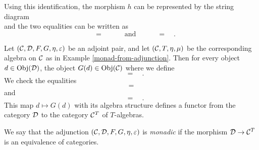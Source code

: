 \documentclass{amsart}
\begin{document}
Using this identification, the morphism $h$ can be represented by the
    string diagram
\[
    
\]
    and the two equalities can be written as
\[
    
    \quad=\quad
    
    \qquad\text{and}\qquad
    
    \quad=\quad
    
    .
\]
\begin{definition}
    Let $(\mathcal C, \mathcal D, F, G, \eta, \varepsilon)$ be an adjoint pair,
        and let $(\mathcal C, T, \eta, \mu)$ be the corresponding
        algebra on $\mathcal C$ as in Example \ref{monad-from-adjunction}.
    Then for every object $d\in \operatorname{Obj}(\mathcal D)$,
        the object $G(d)\in \operatorname{Obj}(\mathcal C)$
        where we define
    \[
        
        \quad=\quad
        
        .
    \]
    We check the equalities
    \[
        
        \quad=\quad
        
    \]
    and
    \[
        
        \quad=\quad
        
        .
    \]
    This map $d\mapsto G(d)$ with its algebra structure 
        defines a functor from the category $\mathcal D$ to the category $\mathcal C^T$
        of $T$-algebras.

    We say that the adjunction $(\mathcal C, \mathcal D, F,G,\eta,\varepsilon)$
        is {\em monadic}
        if the morphism $\mathcal D\to \mathcal C^T$ is an equivalence of categories.
\end{definition}
\end{document}
